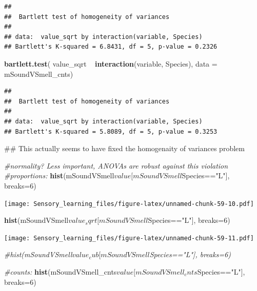 \documentclass[]{article}
\newenvironment{Shaded}{\begin{snugshade}}{\end{snugshade}}
\newcommand{\KeywordTok}[1]{\textcolor[rgb]{0.13,0.29,0.53}{\textbf{{#1}}}}
\newcommand{\DataTypeTok}[1]{\textcolor[rgb]{0.13,0.29,0.53}{{#1}}}
\newcommand{\DecValTok}[1]{\textcolor[rgb]{0.00,0.00,0.81}{{#1}}}
\newcommand{\StringTok}[1]{\textcolor[rgb]{0.31,0.60,0.02}{{#1}}}
\newcommand{\CommentTok}[1]{\textcolor[rgb]{0.56,0.35,0.01}{\textit{{#1}}}}
\newcommand{\NormalTok}[1]{{#1}}
\begin{document}
\begin{verbatim}
## 
##  Bartlett test of homogeneity of variances
## 
## data:  value_sqrt by interaction(variable, Species)
## Bartlett's K-squared = 6.8431, df = 5, p-value = 0.2326
\end{verbatim}

\begin{Shaded}
\begin{Highlighting}[]
\KeywordTok{bartlett.test}\NormalTok{( value_sqrt ~}\StringTok{  }\KeywordTok{interaction}\NormalTok{(variable, Species), }\DataTypeTok{data =} \NormalTok{mSoundVSmell_cnts)}
\end{Highlighting}
\end{Shaded}

\begin{verbatim}
## 
##  Bartlett test of homogeneity of variances
## 
## data:  value_sqrt by interaction(variable, Species)
## Bartlett's K-squared = 5.8089, df = 5, p-value = 0.3253
\end{verbatim}

\begin{Shaded}
\begin{Highlighting}[]
\NormalTok{## This actually seems to have fixed the homogenaity of variances problem}

\CommentTok{#normality? Less important, ANOVAs are robust against this violation}
\CommentTok{#proportions: }
\KeywordTok{hist}\NormalTok{(mSoundVSmell$value[mSoundVSmell$Species==}\StringTok{"L"}\NormalTok{], }\DataTypeTok{breaks=}\DecValTok{6}\NormalTok{)}
\end{Highlighting}
\end{Shaded}

\texttt{[image: Sensory\_learning\_files/figure-latex/unnamed-chunk-59-10.pdf]}

\begin{Shaded}
\begin{Highlighting}[]
\KeywordTok{hist}\NormalTok{(mSoundVSmell$value_sqrt[mSoundVSmell$Species==}\StringTok{"L"}\NormalTok{], }\DataTypeTok{breaks=}\DecValTok{6}\NormalTok{)}
\end{Highlighting}
\end{Shaded}

\texttt{[image: Sensory\_learning\_files/figure-latex/unnamed-chunk-59-11.pdf]}

\begin{Shaded}
\begin{Highlighting}[]
\CommentTok{#hist(mSoundVSmell$value_cub[mSoundVSmell$Species=="L"], breaks=6)}


\CommentTok{#counts:}
\KeywordTok{hist}\NormalTok{(mSoundVSmell_cnts$value[mSoundVSmell_cnts$Species==}\StringTok{"L"}\NormalTok{], }\DataTypeTok{breaks=}\DecValTok{6}\NormalTok{)}
\end{Highlighting}
\end{Shaded}
\end{document}
